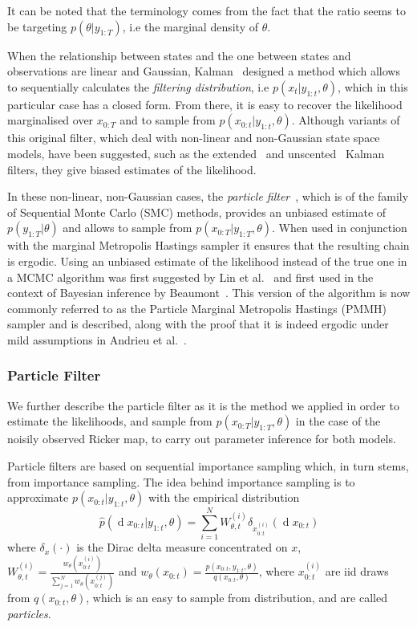 \documentclass[12pt]{article}
\begin{document}
	It can be noted that the terminology comes from the fact that the ratio seems to be targeting $p(\theta | y_{1:T})$, i.e the marginal density of $\theta$.
	
 	When the relationship between states and the one between states and observations are linear and Gaussian, Kalman~\cite{Kalman1960} designed a method which allows to sequentially calculates the \emph{filtering distribution}, i.e $p(x_{t}| y_{1:t}, \theta)$, which in this particular case has a closed form. From there, it is easy to recover the likelihood marginalised over $x_{0:T}$ and to sample from $p(x_{0:t}| y_{1:t}, \theta)$. Although variants of this original filter, which deal with non-linear and non-Gaussian state space models, have been suggested, such as the extended~\cite{McElhoe1966} and unscented~\cite{Julier1997} Kalman filters, they give biased estimates of the likelihood. 
 	
 	In these non-linear, non-Gaussian cases, the \emph{particle filter}~\cite{gordon1993novel}, which is of the family of Sequential Monte Carlo (SMC) methods, provides an unbiased estimate of $p(y_{1:T}| \theta)$ and allows to sample from $p(x_{0:T}|y_{1:T}, \theta)$. When used in conjunction with the marginal Metropolis Hastings sampler it ensures that the resulting chain is ergodic. Using an unbiased estimate of the likelihood instead of the true one in a MCMC algorithm was first suggested by Lin et al.~\cite{lin2000noisy} and first used in the context of Bayesian inference by Beaumont~\cite{beaumont2003estimation}. This version of the algorithm is now commonly referred to as the Particle Marginal Metropolis Hastings (PMMH) sampler and is described, along with the proof that it is indeed ergodic under mild assumptions in Andrieu et al.~\cite{andrieu2010particle}.
	
	\subsubsection{Particle Filter}
	We further describe the particle filter as it is the method we applied in order to estimate the likelihoods, and sample from $p(x_{0:T}|y_{1:T}, \theta)$ in the case of the noisily observed Ricker map, to carry out parameter inference for both models.
	
	Particle filters are based on sequential importance sampling which, in turn stems, from importance sampling.
	The idea behind importance sampling is to approximate $p(x_{0:t}|y_{1:t}, \theta)$ with the empirical distribution
	\begin{equation}
	\hat{p}(\operatorname{d}x_{0:t}|y_{1:t}, \theta) = \sum_{i=1}^{N}W_{\theta, t}^{(i)} \delta_{x_{0:t}^{(i)}}(\operatorname{d}x_{0:t})
	\end{equation}
	where $\delta_x(\cdot)$ is the Dirac delta measure concentrated on $x$, $W_{\theta, t}^{(i)} = \frac{ w_\theta(x_{0:t}^{(i)})}{ \sum_{j=1}^{N} w_\theta(x_{0:t}^{(j)})}$ and $w_\theta(x_{0:t}) = \frac{ p(x_{0:t},y_{1:t}, \theta)}{ q(x_{0:t}, \theta)}$, where $x_{0:t}^{(i)}$ are iid draws from $q(x_{0:t}, \theta)$, which is an easy to sample from distribution, and are called \emph{particles}.
	
\end{document}

